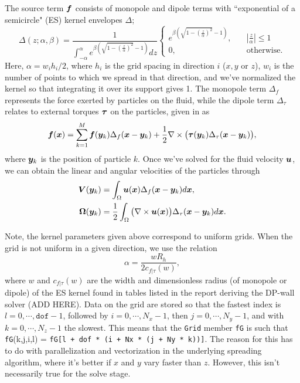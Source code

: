 The source term $\boldsymbol f$ consists of monopole and dipole terms with ``exponential of a semicircle" (ES) kernel \cite{barnett} envelopes $\Delta$;
\begin{equation}
\Delta(z;\alpha,\beta) = \displaystyle \frac{1}{\displaystyle \int_{-\alpha}^\alpha e^{\beta(\sqrt{1-(\frac{z}{\alpha})^2}-1)}dz} \begin{cases}
e^{\beta(\sqrt{1-(\frac{z}{\alpha})^2}-1)},\quad &|\frac{z}{\alpha}| \leq 1\\
0,\quad &\text{otherwise}.
\end{cases}
\end{equation}
Here, $\alpha = w_ih_i/2$, where $h_i$ is the grid spacing in direction $i$ ($x,y$ or $z$), $w_i$ is the number of points to which we spread in that direction, and we've normalized the kernel so that integrating it over its support gives 1. The monopole term $\Delta_f$ represents the force exerted by particles on the fluid, while the dipole term $\Delta_\tau$ relates to external torques $\boldsymbol \tau$ on the particles, given in \cite{lomholt} as
\begin{equation}\label{fcm}
\boldsymbol f(\boldsymbol x) = \displaystyle \sum_{k=1}^M \boldsymbol f(\boldsymbol y_k)\Delta_f(\boldsymbol x - \boldsymbol y_k) +\frac{1}{2}\nabla \times  \big(\boldsymbol{\tau}(\boldsymbol y_k)\Delta_\tau(\boldsymbol x - \boldsymbol y_k)\big) ,
\end{equation}
where $\boldsymbol y_k$ is the position of particle $k$. Once we've solved for the fluid velocity $\boldsymbol u$, we can obtain the linear and angular velocities of the particles through
\begin{align}
\boldsymbol V(\boldsymbol y_k) &= \displaystyle \int_\Omega \boldsymbol u(\boldsymbol x) \Delta_f(\boldsymbol x - \boldsymbol y_k)d\boldsymbol x,\label{getpartvels}\\
\boldsymbol \Omega(\boldsymbol y_k) &= \frac{1}{2}\displaystyle \int_\Omega \big(\nabla \times \boldsymbol u(\boldsymbol x)\big) \Delta_\tau(\boldsymbol x - \boldsymbol y_k)d\boldsymbol x\label{getpartvort}.
\end{align}

Note, the kernel parameters given above correspond to uniform grids. When the grid is not uniform in a given direction, we use the relation
\begin{equation}
\alpha = \frac{w R_h}{2 c_{f|\tau}(w)},
\end{equation}
where $w$ and $c_{f|\tau}(w)$ are the width and dimensionless radius (of monopole or dipole) of the ES kernel found in tables listed in the report deriving the DP-wall solver (ADD HERE).
Data on the grid are stored so that the fastest index is $l = 0,\cdots,\texttt{dof}-1$, followed by $i = 0,\cdots,N_x-1$, then $j = 0, \cdots, N_y-1$, and with $k = 0,\cdots ,N_z-1$ the slowest. This means that the \texttt{Grid} member \texttt{fG} is such that \texttt{fG}(k,j,i,l) = \texttt{fG[l + dof * (i + Nx * (j + Ny * k))]}.
The reason for this has to do with parallelization and vectorization in the underlying spreading algorithm, where it's better if $x$ and $y$ vary faster than $z$. However, this isn't necessarily true for the solve stage. 

